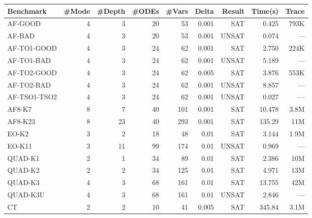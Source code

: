 \newcommand{\hmodel}[2]{\href{http://dreal.cs.cmu.edu/#1}{#2}}
{\small
\begin{table}[!th]
  \centering
  \small
  \begin{tabular}{l|r|r|r|r|r|r|r|r}
    \hline
    \hline
    Benchmark    & \#Mode& \#Depth & \#ODEs & \#Vars  & Delta  & Result       & Time(s) & Trace \\
    \hline
    \hline
      AF-GOOD & 4     & 3        & 20     & 53      & 0.001     & SAT &  0.425    & 793K     \\
       AF-BAD & 4     & 3        & 20     & 53      & 0.001     & UNSAT &  0.074    & ---      \\
  AF-TO1-GOOD & 4     & 3        & 24     & 62      & 0.001     & SAT &  2.750    & 224K     \\
   AF-TO1-BAD & 4     & 3        & 24     & 62      & 0.001     & UNSAT &  5.189    & ---     \\
  AF-TO2-GOOD & 4     & 3        & 24     & 62      & 0.005     & SAT &  3.876    & 553K     \\
   AF-TO2-BAD & 4     & 3        & 24     & 62      & 0.001     & UNSAT &  8.857    & ---     \\
 AF-TSO1-TSO2 & 4     & 3        & 24     & 62      & 0.001     & UNSAT &  0.027    & ---     \\
       AF8-K7 & 8     & 7        & 40     & 101     & 0.001     & SAT & 10.478   & 3.8M      \\
      AF8-K23 & 8     & 23       & 40     & 293     & 0.001     & SAT & 135.29   & 11M      \\
    \hline
    \hline
    EO-K2  & 3     & 2        & 18     & 48      & 0.01    & SAT & 3.144    & 1.9M      \\
    EO-K11 & 3     & 11       & 99     & 174     & 0.01    & UNSAT & 0.969    & ---       \\
    \hline
    \hline
    QUAD-K1  & 2   & 1          & 34     & 89      & 0.01      & SAT & 2.386 &  10M \\
    QUAD-K2  & 2   & 2          & 34     & 125     & 0.01      & SAT & 4.971 &  13M \\
    QUAD-K3  & 4   & 3          & 68     & 161     & 0.01      & SAT & 13.755 & 42M \\
    QUAD-K3U & 4   & 3          & 68     & 161     & 0.01      & UNSAT & 2.846 & --- \\
    \hline
    \hline
    CT       & 2   & 2         & 10      & 41      & 0.005     & SAT & 345.84 & 3.1M\\

\end{tabular}
\end{table}}
